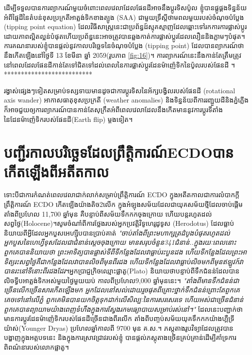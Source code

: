 \documentclass[10pt,twocolumn,letterpaper]{article}
\begin{document}
ដើម្បីទទួលបានការព្យាករណ៍មួយចំពោះពេលវេលាដែលផែនដីអាចនឹងប្តូរទិសប៉ូល ខ្ញុំបានផ្គូផ្គងទិន្នន័យអំពីផ្ទៃដីនៃតំបន់ខុសប្រក្រតីអាត្លង់ទិកខាងត្បូង (SAA) ជាមួយទ្រឹស្តីថាមពលមួយរបស់ចំណុចបំប្លែង (tipping point equation) ដែលវិធីសាស្ត្រនេះជាប្រព័ន្ធដ៍ស្មុគស្មាញដែលឆ្ពោះទៅរកការការផ្លាស់ប្តូរដោយភាពល្អិតល្អន់បំផុត​ហើយប្រព័ន្ធនេះអាចត្រូវបានឆ្លងកាត់ការផ្លាស់ប្តូរដែលលឿននិងភ្លាមៗបំផុត។ការគណនារបស់ខ្ញុំបានផ្តល់នូវកាលបរិច្ឆេទនៃចំណុចបំប្លែង (tipping point) ដែលបានព្យាករណ៍ថា នឹងកើតឡើងនៅថ្ងៃទី 13 ខែមីនា ឆ្នាំ 2059(រូបភាព \ref{fig:16})។ ការព្យាករណ៍នេះនឹងកាន់តែត្រឹមត្រូវ នៅពេលដែលផែនដីកាន់តែទៅជិតទៅដល់ពេលនៃការផ្លាស់ប្តូរដែនម៉ាញ៉េទិកនៃប៉ូលរបស់ផែនដី​ \cite{136}។**************************

រង្វាស់ផ្សេងៗទៀតសម្រាប់ទស្សទាយមានដូចជាការប្តូរទិសនៃអ័ក្សបង្វិលរបស់ផែនដី (rotational axis wander) អាកាសធាតុខុសប្រក្រតី (weather anomalies) និងទិន្នន័យពីការរញ្ជួយដីនិងភ្នំភ្លើង ក៏អាចជួយឲ្យការព្យាករណ៍បានកាន់តែសុក្រឹតអំពីពេលវេលាដែលនឹងកើតមាននូវការប្តូរទីតាំងនៃដែនម៉ាញ៉េទិករបស់ផែនដី(Earth flip) ម្តងទៀត។

\section{បញ្ជីរកាលបរិច្ឆេទដែលព្រឹត្តិការណ៍​ECDO​បានកើតឡើងពីអតីតកាល}

ទោះបីជាការកំណត់ពេលវេលាជាក់លាក់សម្រាប់ព្រឹត្តិការណ៍ ECDO ក្នុងអតីតកាលជាការលំបាកក្តី​ព្រឹត្តិការណ៍ ECDO កើតឡើងយ៉ាងតិច2លើក ក្នុងអំឡុងសម័យដែលជាយុគសម័យថ្មីដែលចាប់ផ្តើមតាំងពីប្រហែល 11,700 ឆ្នាំមុន គឺបន្ទាប់ពីសម័យទឹកកកចុងក្រោយ ហើយបន្តរហូតដល់សព្វថ្ងៃ(Holocene)។សូមចំណាំពីការថ្លែងរបស់អ្នកប្រវត្តិវិទូហេរូដូទូស (Herodotus) ដែលធ្លាប់និយាយពីអ្វីដែលអ្នកបួសអេហ្ស៊ីបបានប្រាប់គាត់ \textit{"ចាប់តាំងពីព្រះមហាក្សត្រដំបូងបំផុតរហូតដល់អ្នកបួសនៃហេហ្វីទុសដែលជាជំនាន់ស្តេចចុងក្រោយ មានសរុបចំនួន341ជំនាន់..ក្នុងរយៈពេលនោះ ពួកគេបាននិយាយថា ព្រះអាទិត្យបានផ្លាស់ទីពីទីកន្លែងដែលវាធ្លាប់រះបួនដង ហើយទីកន្លែងដែលព្រះអាទិត្យរះសព្វថ្ងៃគឺជាកន្លែងដែលវាបានលិចពីមុនពីរដង ហើយទីកន្លែងដែលវាធ្លាប់លិចមកពីមុនឥឡូវក៍វាបានរះនៅទីនោះពីរដងដែរ}\cite{111}។អ្នកប្រាជ្ញក្រិចឈ្មោះ​ផ្លាតូ​(Plato) និយាយថាបន្ទាប់ពីទឹកជំនន់ដែលបានលិចទ្វីបអាត្លង់ទិកអស់មួយថ្ងៃមួយយប់ កាលពីប្រហែល9,000 ឆ្នាំមុននេះ។ \textit{"តាំងពីមានទឹកជំនន់ជាច្រើនលើកច្រើនសារកើតឡើងមក អ្នកដែលនៅសល់ដោយរួចផុតពីគ្រោះថ្នាក់ទឹកជំនន់ព្រោះតែពួកគេគេចទៅនៅលើភ្នំ ពួកគេមិនបានយកចិត្តទុកដាក់លើសិល្បៈនៃការសរសេរទេ ហើយអស់ជាច្រើនជំនាន់ពួកគេបានព្យាយាមយ៉ាងពេញទំហឹងក្នុងការស្វែងរកមធ្យោបាយសម្រាប់រស់នៅ។"} \cite{112} ដែលនេះបញ្ជាក់ថា មានការប្តូរដែនម៉ាញ៉េទិករបស់ផែនដីច្រើនជាងពីរលើក តាំងពីបញ្ចប់សម័យយុគទឹកកកយ៉ាងហ្គឺទ្រីយ៉ាស់(Younger Dryas) ប្រហែលឆ្នាំកាលពី 9700 មុន គ.ស.។ ភស្តុតាងរូបវិទ្យាដែលត្រូវបានបង្ហាញក្នុងអត្តបទនេះ និងក្នុងការស្រាវជ្រាវរបស់ខ្ញុំ\cite{2} បានផ្ដល់ភស្តុតាងច្រើនគ្រប់គ្រាន់ដើម្បីគាំទ្រការពិពណ៌នារបស់លោកផ្លាតូ។
\end{document}
